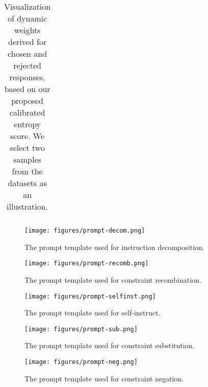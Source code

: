 \begin{table}[t]
{\begin{tabular}{l}
\end{tabular}}
\caption{Visualization of dynamic weights derived for chosen and rejected responses, based on our proposed calibrated entropy score. We select two samples from the datasets as an illustration.}
\label{tab:case-study}
\end{table}


\begin{figure}[h]
    \centering
    \texttt{[image: figures/prompt-decom.png]}
    \caption{The prompt template used for instruction decomposition.}
    \label{fig: prompt-decom}
    \vspace{-1mm}
\end{figure}

\begin{figure}[h]
    \centering
    \texttt{[image: figures/prompt-recomb.png]}
    \caption{The prompt template used for constraint recombination.}
    \label{fig: prompt-recomb}
    \vspace{-1mm}
\end{figure}

\begin{figure}[h]
    \centering
    \texttt{[image: figures/prompt-selfinst.png]}
    \caption{The prompt template used for self-instruct.}
    \label{fig: prompt-selfinst}
    \vspace{-1mm}
\end{figure}

\begin{figure}[h]
    \centering
    \texttt{[image: figures/prompt-sub.png]}
    \caption{The prompt template used for constraint substitution.}
    \label{fig: prompt-sub}
    \vspace{-1mm}
\end{figure}

\begin{figure}[h]
    \centering
    \texttt{[image: figures/prompt-neg.png]}
    \caption{The prompt template used for constraint negation.}
    \label{fig: prompt-neg}
    \vspace{-1mm}
\end{figure}
